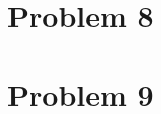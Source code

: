 \documentclass[aps,rmp,preprint,amsmath,amssymb,longbibliography,floatfix]{revtex4-1}
\begin{document}
\section*{Problem 8}
\label{sec:prob8}

\section*{Problem 9}
\label{sec:prob9}







\newpage

\appendix

\end{document}
